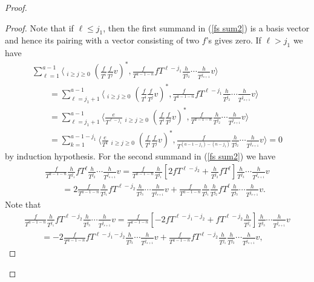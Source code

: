 \documentclass[11pt]{article}
\numberwithin{equation}{section}
\begin{document}
\begin{proof}
\begin{proof}
Note that if $\ell \leq j_1$, then the first summand in (\ref{fs sum2}) is a basis vector and hence its pairing with a vector consisting of two $f$'s gives zero. If $\ell > j_1$ we have
\begin{gather*}
\sum_{\ell=1}^{a-1} \bigg\langle \mathop{\sum_{i+j=a-1-\ell}}_{i\geq j\geq 0} \left(\frac{f}{T^i}\frac{f}{T^j}v\right)^*, \frac{f}{T^{a-1-n}} fT^{\ell-j_1} \frac{h}{T^{j_2}} \cdots \frac{h}{T^{j_{s+1}}} v \bigg\rangle\\
\qquad{} = \sum_{\ell=j_1+1}^{a-1} \bigg\langle \mathop{\sum_{i+j=a-1-\ell}}_{i\geq j\geq 0} \left(\frac{f}{T^i}\frac{f}{T^j}v\right)^*, \frac{f}{T^{a-1-n}} fT^{\ell-j_1} \frac{h}{T^{j_2}} \cdots \frac{h}{T^{j_{s+1}}} v \bigg\rangle \\
\qquad{} = \sum_{\ell=j_1+1}^{a-1} \bigg\langle \frac{e}{T^{\ell-j_1}} \mathop{\sum_{i+j=a-1-\ell}}_{i\geq j\geq 0} \left(\frac{f}{T^i}\frac{f}{T^j}v\right)^*, \frac{f}{T^{a-1-n}} \frac{h}{T^{j_2}} \cdots \frac{h}{T^{j_{s+1}}} v \bigg\rangle \\
\qquad{} = \sum_{k=1}^{a-1-j_1} \bigg\langle \frac{e}{T^{k}} \mathop{\sum_{i+j=a-1-j_1 - k}}_{i\geq j\geq 0} \left(\frac{f}{T^i}\frac{f}{T^j}v\right)^*, \frac{f}{T^{(a-1-j_1)-(n-j_1)}} \frac{h}{T^{j_2}} \cdots \frac{h}{T^{j_{s+1}}} v \bigg\rangle = 0
\end{gather*}
by induction hypothesis. For the second summand in (\ref{fs sum2}) we have
\begin{gather}
\frac{f}{T^{a-1-n}} \frac{h}{T^{j_1}} fT^{\ell} \frac{h}{T^{j_2}} \cdots \frac{h}{T^{j_{s+1}}} v = \frac{f}{T^{a-1-n}} \frac{h}{T^{j_1}} \left[ 2fT^{\ell-j_2} + \frac{h}{T^{j_2}} fT^{\ell} \right] \frac{h}{T^{j_3}} \cdots \frac{h}{T^{j_{s+1}}} v \nonumber \\
\qquad{} = 2 \frac{f}{T^{a-1-n}} \frac{h}{T^{j_1}} fT^{\ell-j_2} \frac{h}{T^{j_3}} \cdots \frac{h}{T^{j_{s+1}}} v + \frac{f}{T^{a-1-n}} \frac{h}{T^{j_1}} \frac{h}{T^{j_2}} fT^{\ell} \frac{h}{T^{j_3}} \cdots \frac{h}{T^{j_{s+1}}} v. \label{2f}
\end{gather}
Note that
\begin{gather*}
\frac{f}{T^{a-1-n}} \frac{h}{T^{j_1}} fT^{\ell-j_2} \frac{h}{T^{j_3}} \cdots \frac{h}{T^{j_{s+1}}} v = \frac{f}{T^{a-1-n}} \left[ -2 fT^{\ell-j_1-j_2} + fT^{\ell-j_2} \frac{h}{T^{j_1}} \right] \frac{h}{T^{j_3}} \cdots \frac{h}{T^{j_{s+1}}} v \\
\qquad{} = -2 \frac{f}{T^{a-1-n}} fT^{\ell-j_1-j_2} \frac{h}{T^{j_3}} \cdots \frac{h}{T^{j_{s+1}}} v + \frac{f}{T^{a-1-n}} fT^{\ell-j_2} \frac{h}{T^{j_1}} \frac{h}{T^{j_3}} \cdots \frac{h}{T^{j_{s+1}}} v,

\end{gather*}
\end{proof}
\end{proof}
\end{document}
